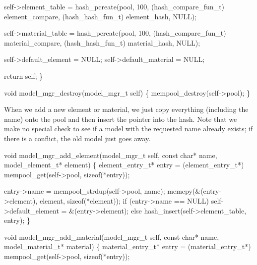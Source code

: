     self->element_table = hash_pcreate(pool, 100, 
                                       (hash_compare_fun_t) element_compare,
                                       (hash_hash_fun_t)    element_hash,
                                       NULL);

    self->material_table = hash_pcreate(pool, 100,
                                        (hash_compare_fun_t) material_compare,
                                        (hash_hash_fun_t)    material_hash,
                                        NULL);

    self->default_element = NULL;
    self->default_material = NULL;

    return self;
\}

\nwendcode{}\nwdocspar

\nwenddocs{}\plusendmoddef
void model_mgr_destroy(model_mgr_t self)
\{
    mempool_destroy(self->pool);
\}

\nwendcode{}\nwdocspar

When we add a new element or material, we just copy everything
(including the name) onto the pool and then insert the pointer
into the hash.  Note that we make no special check to see if a
model with the requested name already exists; if there is a conflict,
the old model just goes away.

\nwenddocs{}\plusendmoddef
void model_mgr_add_element(model_mgr_t self, const char* name,
                           model_element_t* element)
\{
    element_entry_t* entry = 
        (element_entry_t*) mempool_get(self->pool, sizeof(*entry));
    
    entry->name = mempool_strdup(self->pool, name);
    memcpy(&(entry->element), element, sizeof(*element));
    if (entry->name == NULL)
        self->default_element = &(entry->element);
    else
        hash_insert(self->element_table, entry);
\}

\nwendcode{}\nwdocspar

\nwenddocs{}\plusendmoddef
void model_mgr_add_material(model_mgr_t self, const char* name,
                            model_material_t* material)
\{
    material_entry_t* entry = 
        (material_entry_t*) mempool_get(self->pool, sizeof(*entry));
    
